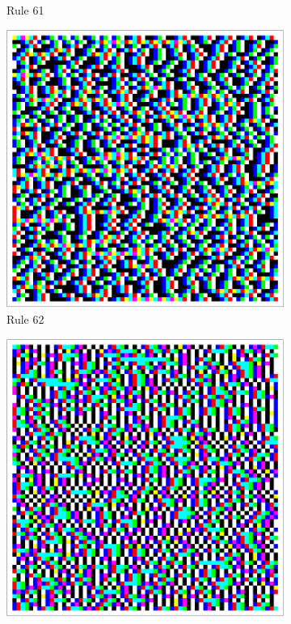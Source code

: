 \documentclass{article}
\begin{document}
\begin{figure}[H]
\begin{subfigure}[b]{0.135\textwidth}
        \vspace{-16pt}\caption*{Rule 61}
        \label{fig:rule-61-center_columns-4096}
    \end{subfigure}
    \begin{subfigure}[b]{0.135\textwidth}
        \centering
        \includegraphics[width=\textwidth]{graphics/behavior/center-columns/rule-62-center_columns-4096.pdf}
        \vspace{-16pt}\caption*{Rule 62}
        \label{fig:rule-62-center_columns-4096}
    \end{subfigure}
    \begin{subfigure}[b]{0.135\textwidth}
        \centering
        \includegraphics[width=\textwidth]{graphics/behavior/center-columns/rule-67-center_columns-4096.pdf}

\end{subfigure}
\end{figure}
\end{document}
